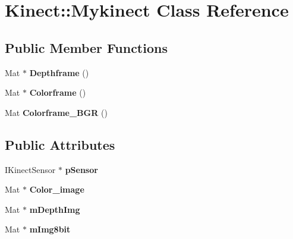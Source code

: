 \hypertarget{class_kinect_1_1_mykinect}{}\section{Kinect\+:\+:Mykinect Class Reference}
\label{class_kinect_1_1_mykinect}
\subsection*{Public Member Functions}
\begin{DoxyCompactItemize}
\item 
\mbox{\label{class_kinect_1_1_mykinect_a227250c1d550461785de6d6302d03412}} 
Mat $\ast$ {\bfseries Depthframe} ()
\item 
\mbox{\label{class_kinect_1_1_mykinect_a25484739101668e7f3454dcfdddbfcaa}} 
Mat $\ast$ {\bfseries Colorframe} ()
\item 
\mbox{\label{class_kinect_1_1_mykinect_a6ad08a793cc6df2ef3cd7064ca1ee3c5}} 
Mat {\bfseries Colorframe\+\_\+\+B\+GR} ()
\end{DoxyCompactItemize}
\subsection*{Public Attributes}
\begin{DoxyCompactItemize}
\item 
\mbox{\label{class_kinect_1_1_mykinect_a878386159bff0287612827763faff0cd}} 
I\+Kinect\+Sensor $\ast$ {\bfseries p\+Sensor}
\item 
\mbox{\label{class_kinect_1_1_mykinect_a002455ea464028c988d09acba8361494}} 
Mat $\ast$ {\bfseries Color\+\_\+image}
\item 
\mbox{\label{class_kinect_1_1_mykinect_a06f1275c65580346aff8977d4ea80158}} 
Mat $\ast$ {\bfseries m\+Depth\+Img}
\item 
\mbox{\label{class_kinect_1_1_mykinect_a730766ceec7df166f53f49630f2ce8fc}} 
Mat $\ast$ {\bfseries m\+Img8bit}
\end{DoxyCompactItemize}
